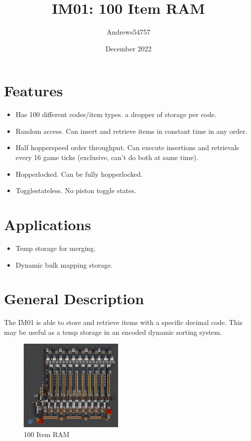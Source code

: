 \documentclass[10pt]{datasheet}
\title{IM01: 100 Item RAM}
\author{Andrews54757}
\date{December 2022}
\begin{document}
\maketitle

\section{Features}

\begin{itemize}
\item{Has 100 different codes/item types. a dropper of storage per code.}
\item{Random access. Can insert and retrieve items in constant time in any order.}
\item{Half hopperspeed order throughput. Can execute insertions and retrievals every 16 game ticks (exclusive, can't do both at same time).}
\item{Hopperlocked. Can be fully hopperlocked.}
\item{Togglestateless. No piston toggle states.}
\end{itemize}

\section{Applications}
\begin{itemize}
\item{Temp storage for merging.}
\item{Dynamic bulk mapping storage.}
\end{itemize}

\section{General Description}
The IM01 is able to store and retrieve items with a specific decimal code. This may be useful as a temp storage in an encoded dynamic sorting system.
\vfill\break

\begin{figure}[h]
    \includegraphics[width=0.45\textwidth]{itemram.png}
    \caption{100 Item RAM}
\end{figure}
\end{document}
